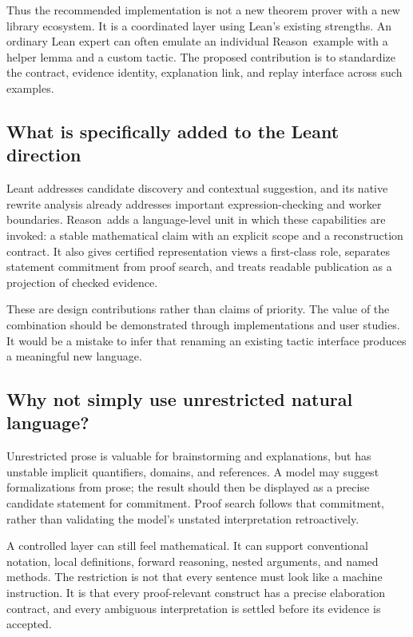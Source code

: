 \documentclass[11pt,a4paper]{article}
\newcommand{\Reason}{\textsf{Reason}}
\theoremstyle{remark}
\begin{document}
Thus the recommended implementation is not a new theorem prover with a new library ecosystem. It is a coordinated layer using Lean's existing strengths. An ordinary Lean expert can often emulate an individual \Reason\ example with a helper lemma and a custom tactic. The proposed contribution is to standardize the contract, evidence identity, explanation link, and replay interface across such examples.

\subsection{What is specifically added to the Leant direction}

Leant addresses candidate discovery and contextual suggestion, and its native rewrite analysis already addresses important expression-checking and worker boundaries. \Reason\ adds a language-level unit in which these capabilities are invoked: a stable mathematical claim with an explicit scope and a reconstruction contract. It also gives certified representation views a first-class role, separates statement commitment from proof search, and treats readable publication as a projection of checked evidence.

These are design contributions rather than claims of priority. The value of the combination should be demonstrated through implementations and user studies. It would be a mistake to infer that renaming an existing tactic interface produces a meaningful new language.

\subsection{Why not simply use unrestricted natural language?}

Unrestricted prose is valuable for brainstorming and explanations, but has unstable implicit quantifiers, domains, and references. A model may suggest formalizations from prose; the result should then be displayed as a precise candidate statement for commitment. Proof search follows that commitment, rather than validating the model's unstated interpretation retroactively.

A controlled layer can still feel mathematical. It can support conventional notation, local definitions, forward reasoning, nested arguments, and named methods. The restriction is not that every sentence must look like a machine instruction. It is that every proof-relevant construct has a precise elaboration contract, and every ambiguous interpretation is settled before its evidence is accepted.
\end{document}
